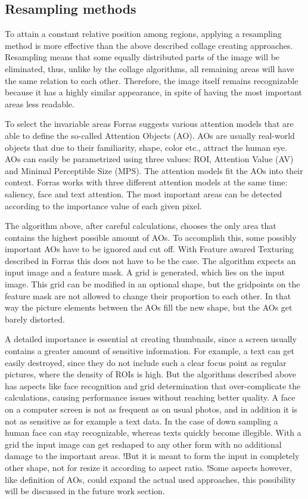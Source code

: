 \documentclass[draft,final]{vutinfth} %
\begin{document}
	\subsection{Resampling methods}
	To attain a constant relative position among regions, applying a resampling method is more effective than the above described collage creating approaches.
	Resampling means that some equally distributed parts of the image will be eliminated, thus, unlike by the collage algorithms, all remaining areas will have the same relation to each other.
	Therefore, the image itself remains recognizable because it has a highly similar appearance, in spite of having the most important areas less readable.\par 
	To select the invariable areas Forras suggests various attention models that are able to define the so-called Attention Objects (AO).
	AOs are usually real-world objects that due to their familiarity, shape, color etc., attract the human eye.
	AOs can easily be parametrized using three values: ROI, Attention Value (AV) and Minimal Perceptible Size (MPS).
	The attention models fit the AOs into their context.
	Forras works with three different attention models at the same time: saliency, face and text attention.
	The most important areas can be detected according to the importance value of each given pixel.\par 
	The algorithm above, after careful calculations, chooses the only area that contains the highest possible amount of AOs.
	To accomplish this, some possibly important AOs have to be ignored and cut off.
	With Feature awared Texturing described in Forras this does not have to be the case.
	The algorithm expects an input image and a feature mask.
	A grid is generated, which lies on the input image.
	This grid can be modified in an optional shape, but the gridpoints on the feature mask are not allowed to change their proportion to each other.
	In that way the picture elements between the AOs fill the new shape, but the AOs get barely distorted. \par 
	A detailed importance is essential at creating thumbnails, since a screen usually contains a greater amount of sensitive information.
	For example, a text can get easily destroyed, since they do not include such a clear focus point as regular pictures, where the density of ROIs is high. 
	But the algorithms described above has aspects like face recognition and grid determination that over-complicate the calculations, causing performance issues without reaching better quality.
	A face on a computer screen is not as frequent as on usual photos, and in addition it is not as sensitive as for example a text data.
	In the case of down sampling a human face can stay recognizable, whereas texts quickly become illegible. 
	With a grid the input image can get reshaped to any other form with no additional damage to the important areas.
	!But it is meant to form the input in completely other shape, not for resize it according to aspect ratio.
	!Some aspects however, like definition of AOs, could expand the actual used approaches, this possibility will be discussed in the future work section.
	
\end{document}

